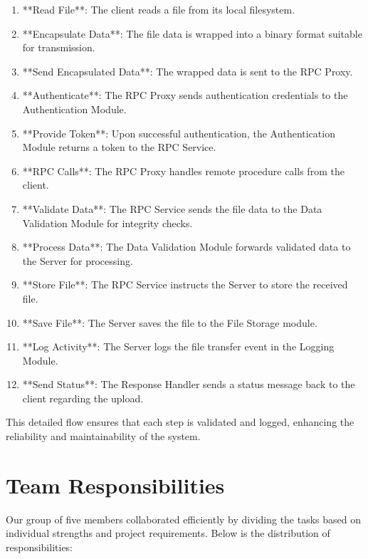 \documentclass[12pt]{article}
\begin{document}
\begin{enumerate}
    \item **Read File**: The client reads a file from its local filesystem.
    \item **Encapsulate Data**: The file data is wrapped into a binary format suitable for transmission.
    \item **Send Encapsulated Data**: The wrapped data is sent to the RPC Proxy.
    \item **Authenticate**: The RPC Proxy sends authentication credentials to the Authentication Module.
    \item **Provide Token**: Upon successful authentication, the Authentication Module returns a token to the RPC Service.
    \item **RPC Calls**: The RPC Proxy handles remote procedure calls from the client.
    \item **Validate Data**: The RPC Service sends the file data to the Data Validation Module for integrity checks.
    \item **Process Data**: The Data Validation Module forwards validated data to the Server for processing.
    \item **Store File**: The RPC Service instructs the Server to store the received file.
    \item **Save File**: The Server saves the file to the File Storage module.
    \item **Log Activity**: The Server logs the file transfer event in the Logging Module.
    \item **Send Status**: The Response Handler sends a status message back to the client regarding the upload.
\end{enumerate}

This detailed flow ensures that each step is validated and logged, enhancing the reliability and maintainability of the system.

\section{Team Responsibilities}
Our group of five members collaborated efficiently by dividing the tasks based on individual strengths and project requirements. Below is the distribution of responsibilities:
\end{document}
